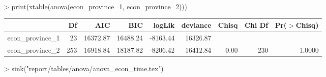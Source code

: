 
>   print(xtable(anova(econ_province_1, econ_province_2)))
\begin{table}[ht]
\centering
\begin{tabular}{lrrrrrrrr}
  \hline
 & Df & AIC & BIC & logLik & deviance & Chisq & Chi Df & Pr($>$Chisq) \\ 
  \hline
econ\_province\_1 & 23 & 16372.87 & 16488.24 & -8163.44 & 16326.87 &  &  &  \\ 
  econ\_province\_2 & 253 & 16918.84 & 18187.82 & -8206.42 & 16412.84 & 0.00 & 230 & 1.0000 \\ 
   \hline
\end{tabular}
\end{table}

>   sink("report/tables/anova/anova_econ_time.tex")
